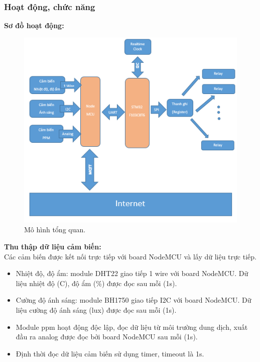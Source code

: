 \documentclass[a4paper,12pt,oneside]{article}
\begin{document}
\subsubsection{Hoạt động, chức năng}
\noindent \textbf{Sơ đồ hoạt động:}\\

\begin{figure}[H]
	\centering
	\includegraphics[scale=1]{hinh/mohinh.png}
	\caption{Mô hình tổng quan.}
\end{figure}


\noindent \textbf{Thu thập dữ liệu cảm biến:}\\
\noindent Các cảm biến được kết nối trực tiếp với board NodeMCU và lấy dữ liệu trực tiếp.
\begin{itemize}
	\item Nhiệt độ, độ ẩm: module DHT22 giao tiếp 1 wire với board NodeMCU. Dữ liệu nhiệt độ (C), độ ẩm (\%) được đọc sau mỗi (1s).
	\item Cường độ ánh sáng: module BH1750 giao tiếp I2C với board NodeMCU. Dữ liệu cường độ ánh sáng (lux) được đọc sau mỗi (1s).
	\item Module ppm hoạt động độc lập, đọc dữ liệu từ môi trường dung dịch, xuất đầu ra analog được đọc bởi board NodeMCU sau mỗi (1s).
	\item Định thời đọc dữ liệu cảm biến sử dụng timer, timeout là 1s.
\end{itemize}
\end{document}
